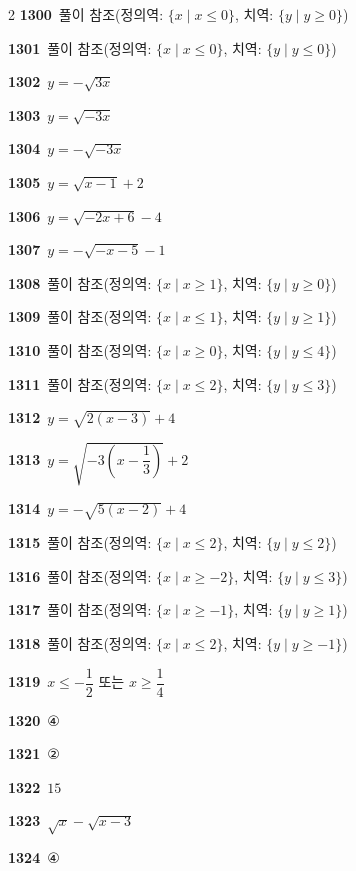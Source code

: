 \documentclass[10pt,a4paper]{article}
\begin{document}
\begin{multicols}{2}
\noindent\textbf{1300}\ 풀이 참조(정의역: $\{x \mid x\le 0\}$, 치역: $\{y \mid y\ge 0\}$)\par
\noindent\textbf{1301}\ 풀이 참조(정의역: $\{x \mid x\le 0\}$, 치역: $\{y \mid y\le 0\}$)\par
\noindent\textbf{1302}\ $y=-\sqrt{3x}$\par
\noindent\textbf{1303}\ $y=\sqrt{-3x}$\par
\noindent\textbf{1304}\ $y=-\sqrt{-3x}$\par
\noindent\textbf{1305}\ $y=\sqrt{x-1}+2$\par
\noindent\textbf{1306}\ $y=\sqrt{-2x+6}-4$\par
\noindent\textbf{1307}\ $y=-\sqrt{-x-5}-1$\par
\noindent\textbf{1308}\ 풀이 참조(정의역: $\{x \mid x\ge 1\}$, 치역: $\{y \mid y\ge 0\}$)\par
\noindent\textbf{1309}\ 풀이 참조(정의역: $\{x \mid x\le 1\}$, 치역: $\{y \mid y\ge 1\}$)\par
\noindent\textbf{1310}\ 풀이 참조(정의역: $\{x \mid x\ge 0\}$, 치역: $\{y \mid y\le 4\}$)\par
\noindent\textbf{1311}\ 풀이 참조(정의역: $\{x \mid x\le 2\}$, 치역: $\{y \mid y\le 3\}$)\par
\noindent\textbf{1312}\ $y=\sqrt{2(x-3)}+4$\par
\noindent\textbf{1313}\ $y=\sqrt{-3\left(x-\dfrac{1}{3}\right)}+2$\par
\noindent\textbf{1314}\ $y=-\sqrt{5(x-2)}+4$\par
\noindent\textbf{1315}\ 풀이 참조(정의역: $\{x \mid x\le 2\}$, 치역: $\{y \mid y\le 2\}$)\par
\noindent\textbf{1316}\ 풀이 참조(정의역: $\{x \mid x\ge -2\}$, 치역: $\{y \mid y\le 3\}$)\par
\noindent\textbf{1317}\ 풀이 참조(정의역: $\{x \mid x\ge -1\}$, 치역: $\{y \mid y\ge 1\}$)\par
\noindent\textbf{1318}\ 풀이 참조(정의역: $\{x \mid x\le 2\}$, 치역: $\{y \mid y\ge -1\}$)\par
\noindent\textbf{1319}\ $x\le -\dfrac{1}{2}$ 또는 $x\ge \dfrac{1}{4}$\par
\noindent\textbf{1320}\ ④\par
\noindent\textbf{1321}\ ②\par
\noindent\textbf{1322}\ $15$\par
\noindent\textbf{1323}\ $\sqrt{x}-\sqrt{x-3}$\par
\noindent\textbf{1324}\ ④\par

\end{multicols}
\end{document}
